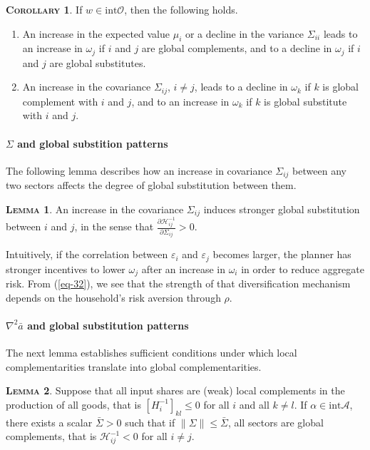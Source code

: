 \documentclass[11pt]{article}
\theoremstyle{definition}
\newtheorem{lemma}{\noindent \textbf{\textsc{Lemma}}}
\newtheorem{cor}{\noindent \textbf{\textsc{Corollary}}}
\begin{document}
	\begin{cor}
		If $w\in\text{int}\mathcal{O}$, then the following holds.
		\begin{enumerate}[leftmargin=1cm, label=\arabic*.]
			\item An increase in the expected value $\mu_i$ or a decline in the variance $\Sigma_{ii}$ leads to an increase in $\omega_j$ if $i$ and $j$ are global complements, and to a decline in $\omega_j$ if $i$ and $j$ are global substitutes.
			\item An increase in the covariance $\Sigma_{ij}$, $i \neq j$, leads to a decline in $\omega_k$ if $k$ is global complement
			with $i$ and $j$, and to an increase in $\omega_k$ if $k$ is global substitute with $i$ and $j$.
		\end{enumerate}
	\end{cor}
	
	
	\paragraph{$\Sigma$ and global substition patterns}
	The following lemma describes how an increase in covariance $\Sigma_{ij}$ between any two sectors affects the degree of global substitution between them.
	
	\begin{lemma}
		An increase in the covariance $\Sigma_{ij}$ induces stronger global substitution between $i$ and $j$, in the sense that $\frac{\partial \mathcal{H}_{ij}^{-1}}{\partial\Sigma_{ij}}>0$.
	\end{lemma}
	
	Intuitively, if the correlation between $\varepsilon_i$ and $\varepsilon_j$ becomes larger, the planner has stronger incentives to lower $\omega_j$ after an increase in $\omega_i$ in order to reduce aggregate risk. From (\ref{eq-32}), we see that the strength of that diversification mechanism depends on the household’s risk aversion through $\rho$.
	
	\paragraph{$\nabla^2\bar{a}$ and global substitution patterns}
	The next lemma establishes sufficient conditions under which local complementarities translate into global complementarities.
	
	\begin{lemma}
		Suppose that all input shares are (weak) local complements in the production of all goods, that is $[H_i^{-1}]_{kl} \leqslant 0$ for all $i$ and all $k\neq l$. If $\alpha\in\text{int}\mathcal{A}$, there exists a scalar $\bar{\Sigma}>0$ such that if $\|\Sigma\| \leqslant \bar{\Sigma}$, all sectors are global complements, that is $\mathcal{H}_{ij}^{-1} < 0$ for all $i\neq j$.
	\end{lemma}
	
\end{document}
